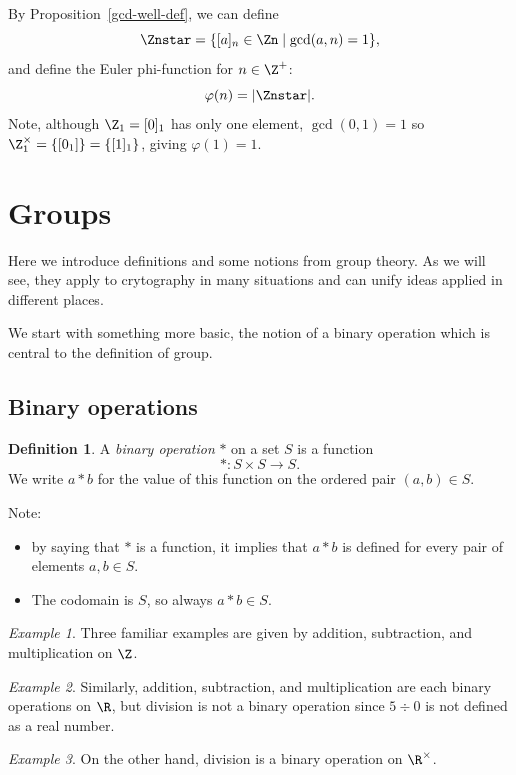\documentclass[12pt]{amsart}
\theoremstyle{plain}
\theoremstyle{definition}
\newtheorem{defn}[thm]{Definition}
\theoremstyle{remark}
\newtheorem*{exam}{Example}
\begin{document}
By Proposition~\ref{gcd-well-def}, we can define
\[ \Znstar = \{[a]_n\in\Zn\mid \gcd(a,n)=1\},\]
and define the Euler phi-function for $n\in\Z^+$:
\[ \varphi(n) = |\Znstar|.\]
Note, although $\Z_1=[0]_1$ has only one element, $\gcd(0,1)=1$ so
$\Z_1^\times=\{[0_1]\} = \{[1]_1\}$, giving $\varphi(1)=1$.




\section{Groups}

Here we introduce definitions and some notions from group theory.  As
we will see, they apply to crytography in many situations and can
unify ideas applied in different places.

We start with something more basic, the notion of a binary operation
which is central to the definition of group.

\subsection{Binary operations}

\begin{defn}
A \emph{binary operation} $*$ on a set $S$ is a function
\[ *:S\times S \to S.\]
We write $a*b$ for the value of this function on the ordered pair
$(a,b)\in S$.
\end{defn}
Note:
\begin{itemize}
\item by saying that $*$ is a function, it implies that $a*b$ is defined
  for every pair of elements $a,b\in S$.
\item The codomain is $S$, so always $a*b\in S$.
\end{itemize}
\begin{exam}
Three familiar examples are given by addition, subtraction, and
multiplication on $\Z$.
\end{exam}

\begin{exam}
Similarly, addition, subtraction,
and multiplication are each binary operations on $\R$, but division is
not a binary operation since $5\div 0$ is not defined as a real number.
\end{exam}

\begin{exam} On the other hand, division is a binary operation on
$\R^\times$.
\end{exam}
\end{document}
